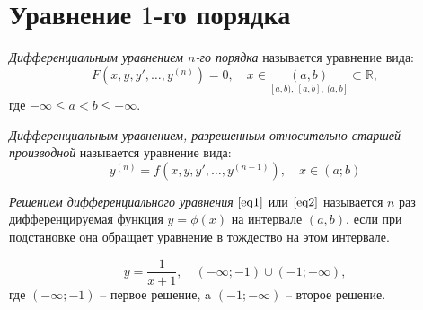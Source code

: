 

\section{Уравнение $1$-го порядка}

\begin{definition}
    \emph{Дифференциальным уравнением $n$-го порядка} называется уравнение вида:
    \begin{equation}\label{eq1}
        F(x,y,y',\ldots,y^{(n)}) = 0, \quad x \in \underset{[a,b), \ [a,b], \ (a,b]}{(a,b)} \subset \mathbb{R},
    \end{equation}
    где $-\infty \leqslant a < b \leqslant +\infty$.
\end{definition}

\begin{definition}
    \emph{Дифференциальным уравнением, разрешенным относительно старшей производной} называется уравнение вида:
    \begin{equation}\label{eq2}
        y^{(n)} = f(x,y,y',\ldots,y^{(n-1)}), \quad x \in (a;b)
    \end{equation}
\end{definition}

\begin{definition}
    \emph{Решением дифференциального уравнения} $\ref{eq1}$ или $\ref{eq2}$ называется $n$ раз дифференцируемая функция $y = \phi(x)$ на интервале $(a,b)$, если при подстановке она обращает уравнение в тождество на этом интервале.
\end{definition}

\begin{example}
    \[
        y = \frac{1}{x+1}, \quad (-\infty; -1) \cup (-1; -\infty),
    \]
    где $(-\infty; -1)$ -- первое решение, a $(-1; -\infty)$ -- второе решение.
\end{example}

\newpage

